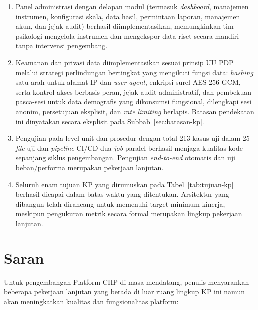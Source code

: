 \begin{enumerate}[leftmargin=2cm]
  \item Panel administrasi dengan delapan modul (termasuk \textit{dashboard}, manajemen instrumen, konfigurasi skala, data hasil, permintaan laporan, manajemen akun, dan jejak audit) berhasil diimplementasikan, memungkinkan tim psikologi mengelola instrumen dan mengekspor data riset secara mandiri tanpa intervensi pengembang.

  \item Keamanan dan privasi data diimplementasikan sesuai prinsip UU PDP melalui strategi perlindungan bertingkat yang mengikuti fungsi data: \textit{hashing} satu arah untuk alamat IP dan \textit{user agent}, enkripsi surel AES-256-GCM, serta kontrol akses berbasis peran, jejak audit administratif, dan pembekuan pasca-sesi untuk data demografis yang dikonsumsi fungsional, dilengkapi sesi anonim, persetujuan eksplisit, dan \textit{rate limiting} berlapis. Batasan pendekatan ini dinyatakan secara eksplisit pada Subbab~\ref{sec:batasan-kp}.

  \item Pengujian pada level unit dan prosedur dengan total 213 kasus uji dalam 25 \textit{file} uji dan \textit{pipeline} CI/CD dua \textit{job} paralel berhasil menjaga kualitas kode sepanjang siklus pengembangan. Pengujian \textit{end-to-end} otomatis dan uji beban/performa merupakan pekerjaan lanjutan.

  \item Seluruh enam tujuan KP yang dirumuskan pada Tabel~\ref{tab:tujuan-kp} berhasil dicapai dalam batas waktu yang ditentukan. Arsitektur yang dibangun telah dirancang untuk memenuhi target minimum kinerja, meskipun pengukuran metrik secara formal merupakan lingkup pekerjaan lanjutan.
\end{enumerate}

\section{Saran}
\label{sec:saran}

Untuk pengembangan Platform CHP di masa mendatang, penulis menyarankan beberapa pekerjaan lanjutan yang berada di luar ruang lingkup KP ini namun akan meningkatkan kualitas dan fungsionalitas platform:

